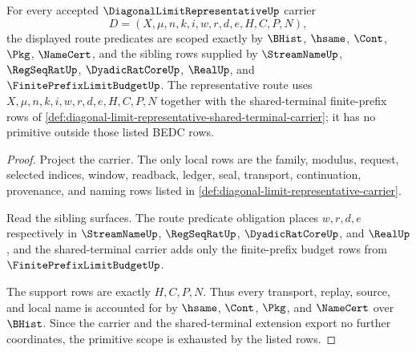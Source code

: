 \begin{theorem}
\label{thm:diagonal-limit-representative-primitive-scope-exhaustion}
For every accepted $\DiagonalLimitRepresentativeUp$ carrier
$$
D=(X,\mu,n,k,i,w,r,d,e,H,C,P,N),
$$
the displayed route predicates are scoped exactly by $\BHist$, $\hsame$, $\Cont$, $\Pkg$, $\NameCert$, and the sibling rows supplied by $\StreamNameUp$, $\RegSeqRatUp$, $\DyadicRatCoreUp$, $\RealUp$, and $\FinitePrefixLimitBudgetUp$. The representative route uses $X,\mu,n,k,i,w,r,d,e,H,C,P,N$ together with the shared-terminal finite-prefix rows of \autoref{def:diagonal-limit-representative-shared-terminal-carrier}; it has no primitive outside those listed BEDC rows.
\end{theorem}
\begin{proof}
Project the carrier. The only local rows are the family, modulus, request, selected indices, window, readback, ledger, seal, transport, continuation, provenance, and naming rows listed in \autoref{def:diagonal-limit-representative-carrier}.

Read the sibling surfaces. The route predicate obligation places $w,r,d,e$ respectively in $\StreamNameUp$, $\RegSeqRatUp$, $\DyadicRatCoreUp$, and $\RealUp$, and the shared-terminal carrier adds only the finite-prefix budget rows from $\FinitePrefixLimitBudgetUp$.

The support rows are exactly $H,C,P,N$. Thus every transport, replay, source, and local name is accounted for by $\hsame$, $\Cont$, $\Pkg$, and $\NameCert$ over $\BHist$. Since the carrier and the shared-terminal extension export no further coordinates, the primitive scope is exhausted by the listed rows.
\end{proof}

